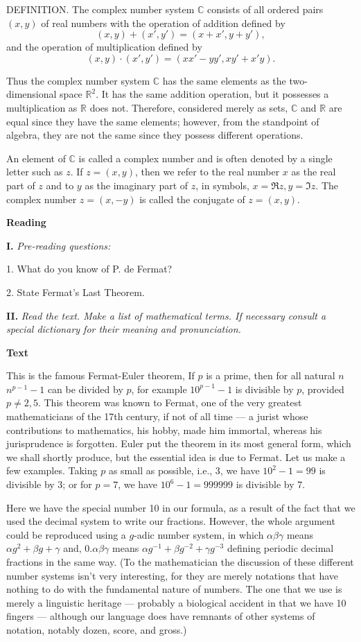 \documentclass[a4paper]{article}
\newcounter{EUnits}
\newcommand{\EUnit}{\par\medskip{\huge \textbf{Unit \arabic{EUnits}}}\par\stepcounter{EUnits}}
\newcommand{\ESect}[1]{\medskip\par{\large \textbf{#1}}\par}
\newcommand{\ETask}[2]{\medskip\par\textbf{#1.} \textit{#2}\par}
\begin{document}
DEFINITION. The complex number system $\mathbb{C}$ consists of all ordered pairs $(x,y)$ of real numbers with the operation
of addition defined by $$(x,y)+(x',y')=(x+x',y+y'),$$ and the operation of multiplication defined by
$$(x,y) \cdot (x',y')=(xx'-yy',xy'+x'y).$$

Thus the complex number system $\mathbb{C}$ has the same elements as the two-dimensional space $\mathbb{R}^2$. It has the same
addition operation, but it possesses a multiplication as $\mathbb{R}$ does not. Therefore, considered merely as sets,
$\mathbb{C}$ and $\mathbb{R}$ are equal since they have the same elements; however, from the standpoint of algebra, they are
not the same since they possess different operations.

An element of $\mathbb{C}$ is called a complex number and is often denoted by a single letter such as $z$. If $z=(x,y)$, then
we refer to the real number $x$ as the real part of $z$ and to $y$ as the imaginary part of $z$, in symbols, $x = \Re z, y = \Im z$.
The complex number $z=(x,-y)$ is called the conjugate of $z=(x,y)$.

\EUnit
\ESect{Reading}

\ETask{I}{Pre-reading questions:}
1. What do you know of P. de Fermat?

2. State Fermat's Last Theorem.

\ETask{II}{Read the text. Make a list of mathematical terms. If necessary consult a special dictionary for their meaning and
pronunciation.}

\ESect{Text}
This is the famous Fermat-Euler theorem, If $p$ is a prime, then for all natural $n$ $n^{p-1}-1$ can be divided by $p$, for
example $10^{p-1} - 1$ is divisible by $p$, provided $p \neq 2,5$. This theorem was known to Fermat, one of the very greatest
mathematicians of the 17th century, if not of all time --- a jurist whose contributions to mathematics, his hobby, made him
immortal, whereas his jurisprudence is forgotten. Euler put the theorem in its most general form, which we shall shortly produce,
but the essential idea is due to Fermat. Let us make a few examples. Taking $p$ as small as possible, i.e., 3, we have $10^2-1=99$
is divisible by 3; or for $p=7$, we have $10^6-1=999999$ is divisible by 7.

Here we have the special number 10 in our formula, as a result of the fact that we used the decimal system to write our fractions.
However, the whole argument could be reproduced using a $g$-adic number system, in which $\alpha \beta \gamma$ means
$\alpha g^2 + \beta g + \gamma$ and, $0.\alpha\beta\gamma$ means $\alpha g^{-1}+ \beta g^{-2} + \gamma g^{-3}$ defining periodic
decimal fractions in the same way. (To the mathematician the discussion of these different number systems isn't very interesting,
for they are merely notations that have nothing to do with the fundamental nature of numbers. The one that we use is merely a
linguistic heritage --- probably a biological accident in that we have 10 fingers --- although our language does have remnants
of other systems of notation, notably dozen, score, and gross.)
\end{document}
